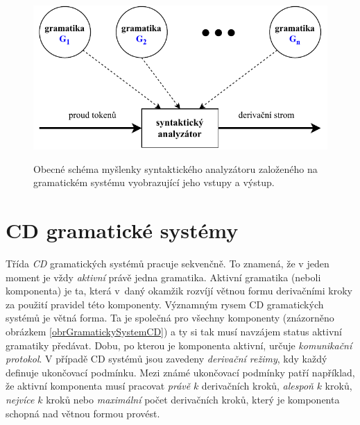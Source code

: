 \begin{figure}[h]\centering
  \centering
  \includegraphics[scale=0.85]{obrazky/GramatickySystemObecny.pdf}\\[1pt]
  \caption{Obecné schéma myšlenky syntaktického analyzátoru založeného na gramatickém systému vyobrazující jeho vstupy a výstup.}
  \label{obrGramatickySystemObecny}
\end{figure}


\section{CD gramatické systémy}
Třída \emph{CD} gramatických systémů pracuje sekvenčně. To znamená, že v jeden moment je vždy \emph{aktivní} právě jedna gramatika. Aktivní gramatika (neboli komponenta) je ta,
která v~daný okamžik rozvíjí větnou formu derivačními kroky za použití pravidel této komponenty. Významným rysem CD gramatických systémů je větná forma.
Ta je společná pro všechny komponenty (znázorněno obrázkem \ref{obrGramatickySystemCD}) a ty si tak musí navzájem status aktivní gramatiky předávat. Dobu, po kterou je komponenta aktivní, určuje
\emph{komunikační protokol}. V případě CD systémů jsou zavedeny \emph{derivační režimy}, kdy každý definuje ukončovací podmínku. Mezi známé ukončovací podmínky
patří například, že aktivní komponenta musí pracovat \emph{právě} $k$ derivačních kroků, \emph{alespoň} $k$ kroků, \emph{nejvíce} $k$ kroků
nebo \emph{maximální} počet derivačních kroků, který je komponenta schopná nad větnou formou provést.

